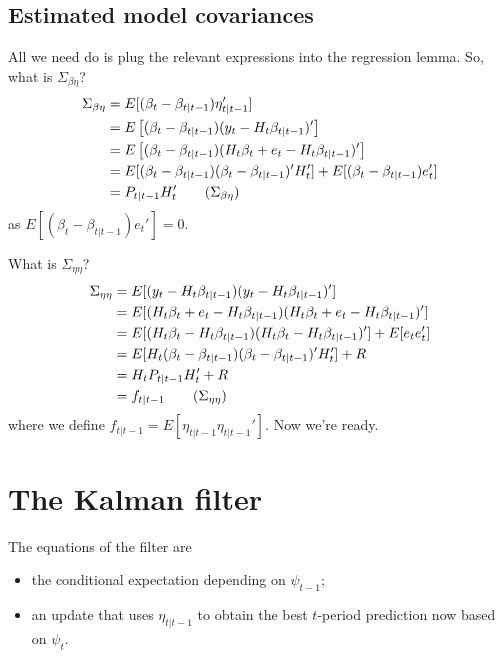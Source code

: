 \documentclass[
  letterpaper,
]{book}
\providecommand{\tightlist}{%
  \setlength{\itemsep}{0pt}\setlength{\parskip}{0pt}}\usepackage{longtable,booktabs,array}
\begin{document}
\hypertarget{estimated-model-covariances}{%
\subsection{Estimated model
covariances}\label{estimated-model-covariances}}

All we need do is plug the relevant expressions into the regression
lemma. So, what is \(\Sigma_{\beta\eta}\)? \begin{align}
\Sigma_{\beta\eta} &= E[(\beta_t-\beta_{t|t-1}) \eta_{t|t-1}'] \\
&= E\left[(\beta_t-\beta_{t|t-1}) (y_t-H_t\beta_{t|t-1})'\right] \\
&= E\left[(\beta_t-\beta_{t|t-1}) (H_t\beta_t+e_t-H_t\beta_{t|t-1})'\right] \\
&= E[(\beta_t-\beta_{t|t-1}) (\beta_t-\beta_{t|t-1})'H_t'] + E[(\beta_t - \beta_{t|t-1}) e_t'] \\
&= P_{t|t-1} H_t' \tag{$\Sigma_{\beta\eta}$} 
\end{align} as \(E[(\beta_t - \beta_{t|t-1})e_t']=0\).

What is \(\Sigma_{\eta\eta}\)? \begin{align}
\Sigma_{\eta\eta} &= E[(y_t-H_t \beta_{t|t-1})(y_t-H_t\beta_{t|t-1})'] \\
                  &= E[(H_t\beta_t+e_t-H_t\beta_{t|t-1})(H_t\beta_t+e_t-H_t\beta_{t|t-1})'] \\
                  &= E[(H_t\beta_t-H_t \beta_{t|t-1})(H_t\beta_t-H_t\beta_{t|t-1})'] + E[e_t e_t'] \\
                  &= E[H_t(\beta_t-\beta_{t|t-1})(\beta_t-\beta_{t|t-1})'H_t'] + R \\
                  &= H_t P_{t|t-1} H_t' + R \\
                  &= f_{t|t-1} \tag{$\Sigma_{\eta\eta}$} \label{svv}
\end{align} where we define \(f_{t|t-1}=E[\eta_{t|t-1}\eta_{t|t-1}']\).
Now we're ready.

\hypertarget{the-kalman-filter}{%
\section{The Kalman filter}\label{the-kalman-filter}}

The equations of the filter are

\begin{itemize}
\tightlist
\item
  the conditional expectation depending on \(\psi_{t-1}\);
\item
  an update that uses \(\eta_{t|t-1}\) to obtain the best \(t\)-period
  prediction now based on \(\psi_t\).
\end{itemize}
\end{document}
